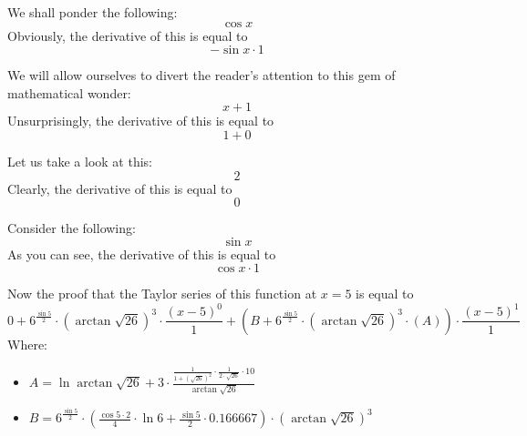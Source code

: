 \documentclass{article}
\begin{document}
We shall ponder the following:
\begin{equation}
\cos x 
\end{equation}
Obviously, the derivative of this is equal to
\begin{equation}
-\sin x \cdot 1 
\end{equation}

We will allow ourselves to divert the reader's attention to this gem of mathematical wonder:
\begin{equation}
x + 1 
\end{equation}
Unsurprisingly, the derivative of this is equal to
\begin{equation}
1 + 0 
\end{equation}

Let us take a look at this:
\begin{equation}
2 
\end{equation}
Clearly, the derivative of this is equal to
\begin{equation}
0 
\end{equation}

Consider the following:
\begin{equation}
\sin x 
\end{equation}
As you can see, the derivative of this is equal to
\begin{equation}
\cos x \cdot 1 
\end{equation}

Now the proof that the Taylor series of this function at $x = 5$ is equal to
\begin{equation}
0 + 6 ^{\frac{\sin 5 }{2 } } \cdot \left( \arctan \sqrt {26 } \right) ^{3 } \cdot \frac{\left( x - 5 \right) ^{0 } }{1 } + \left( B + 6 ^{\frac{\sin 5 }{2 } } \cdot \left( \arctan \sqrt {26 } \right) ^{3 } \cdot \left( A \right) \right) \cdot \frac{\left( x - 5 \right) ^{1 } }{1 } 
\end{equation}
Where:
\begin{itemize}
	\item $A = \ln \arctan \sqrt {26 } + 3 \cdot \frac{\frac{1 }{1 + \left( \sqrt {26 } \right) ^{2 } } \cdot \frac{1 }{2 \cdot \sqrt {26 } } \cdot 10 }{\arctan \sqrt {26 } } $
	\item $B = 6 ^{\frac{\sin 5 }{2 } } \cdot \left( \frac{\cos 5 \cdot 2 }{4 } \cdot \ln 6 + \frac{\sin 5 }{2 } \cdot 0.166667 \right) \cdot \left( \arctan \sqrt {26 } \right) ^{3 } $
\end{itemize}
\end{document}
